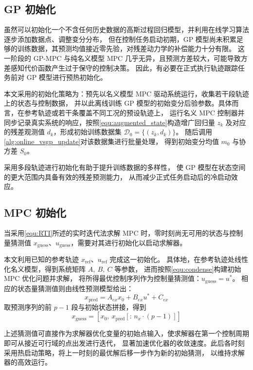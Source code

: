 \subsection{GP 初始化}

虽然可以初始化一个不含任何历史数据的高斯过程回归模型，并利用在线学习算法逐步添加数据点、调整变分分布，
但在控制任务启动初期，GP 模型尚未积累足够的训练数据，其预测均值接近零先验，对残差动力学的补偿能力十分有限。
这一阶段的 GP-MPC 与纯名义模型 MPC 几乎无异，且预测方差较大，可能导致方差感知代价函数产生过于保守的控制决策。
因此，有必要在正式执行轨迹跟踪任务前对 GP 模型进行预热初始化。

本文采用的初始化策略为：预先以名义模型 MPC 驱动系统运行，收集若干段轨迹上的状态与控制数据，
并以此离线训练 GP 模型的初始变分后验参数。具体而言，在参考轨迹或若干条覆盖不同工况的预设轨迹上，
运行名义 MPC 控制器并同步记录真实系统的响应，按照\autoref{equ:augmented_state}构造增广回归量 $z_k$
及对应的残差观测值 $d_k$，形成初始训练数据集 $\mathcal{D}_0 = \{(z_k, d_k)\}$。
随后调用\autoref{alg:online_vsgp_update}对该数据集进行批量处理，
得到初始变分均值 $m_0$ 与协方差 $S_0$。

采用多段轨迹进行初始化有助于提升训练数据的多样性，
使 GP 模型在状态空间的更大范围内具备有效的残差预测能力，
从而减少正式任务启动后的冷启动效应。

\subsection{MPC 初始化}
\label{subsec:mpc_initialization}

当采用\autoref{equ:RTI}所述的实时迭代法求解 MPC 时，零时刻尚无可用的状态与控制量猜测值
$x_{\mathrm{guess}}$、$u_{\mathrm{guess}}$，需要对其进行初始化以启动求解器。

本文利用已知的参考轨迹 $x_{\mathrm{ref}}$、$u_{\mathrm{ref}}$ 完成这一初始化。
具体地，在参考轨迹处线性化名义模型，得到系统矩阵 $A,\ B,\ C$ 等参数，
进而按照\autoref{equ:condense}构建初始 MPC 优化问题并求解，
将所得最优控制序列作为控制量猜测值：$u_{\mathrm{guess}} = u^*$。
相应的状态量猜测值则由线性预测模型给出：
\begin{equation}
    x_{\mathrm{pred}} = A_{ex} x_0 + B_{ex} u^* + C_{ex}
\end{equation}
取预测序列的前 $p-1$ 段与初始状态拼接，得到
\begin{equation}
    x_{\mathrm{guess}} = \left[x_0,\ x_{\mathrm{pred}}[{:}\, n_x \cdot (p-1)]\right]
\end{equation}

上述猜测值可直接作为求解器优化变量的初始点输入，使求解器在第一个控制周期即可从接近可行域的点出发进行迭代，
显著加速优化器的收敛速度。此后各时刻采用热启动策略，将上一时刻的最优解后移一步作为新的初始猜测，
以维持求解器的高效运行。

